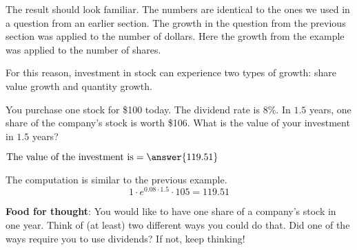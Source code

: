\documentclass{ximera}
\begin{document}
The result should look familiar. The numbers are identical to the ones we used in a question from an earlier section. The growth in the question from the previous section was applied to the number of dollars. Here the growth from the example was applied to the number of shares. 

For this reason, investment in stock can experience two types of growth: share value growth and quantity growth. 

\begin{question}
You purchase one stock for \$100 today. The dividend rate is 8\%. In $1.5$ years, one share of the company's stock is  worth \$106. What is the value of your investment in $1.5$ years?
	\begin{prompt}
		$\text{The value of the investment is}=\answer{119.51}$
	\end{prompt}
\end{question}

\begin{solution}
The computation is similar to the previous example.
	\begin{equation*}
		1\cdot e^{0.08\cdot 1.5}\cdot 105=119.51
	\end{equation*}
\end{solution}

{\bf Food for thought}: You would like to have one share of a company's stock in one year. Think of (at least) two different ways you could do that. Did one of the ways require you to use dividends? If not, keep thinking!
\end{document}
